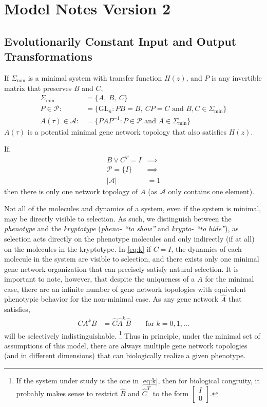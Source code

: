 \documentclass[11 pt]{article}
\newcommand{\A}{\mathcal{A}}
\newcommand{\1}{\mathbbm{1}}
\begin{document}
   \section{Model Notes Version 2}

   \subsection{Evolutionarily Constant Input and Output Transformations}
    If $\Sigma_{\min}$ is a minimal system with transfer function $H(z)$, and $P$ is any invertible matrix that preserves $B$ and $C$, 
    \begin{align*}
      \Sigma_{\min} &= \{A, \ B, \ C \} \\
      P \in \mathcal{P} :&= \{ \text{GL}_{n} : PB = B, \ CP = C \text{ and } B,C \in \Sigma_{\min} \} \\
      A(\tau) \in \A :&= \{P A P^{-1} : P \in \mathcal{P} \text{ and } A \in \Sigma_{\min} \}
    \end{align*}
    $A(\tau)$ is a potential minimal gene network topology that also satisfies $H(z)$. 

    If,
    \begin{align*} 
      B \lor C^{T} = I  &\implies \\
      \mathcal{P} = \{ I \} &\implies \\
      \left\vert \A \right\vert &= 1
    \end{align*}\label{eq:k}
   then there is only one network topology of $A$ (as $\A$ only contains one element).

   Not all of the molecules and dynamics of a system, even if the system is minimal, may be directly visible to selection. As such, we distinguish between the \emph{phenotype} and the \emph{kryptotype} (\emph{pheno- ``to show''} and \emph{krypto- ``to hide''}), as selection acts directly on the phenotype molecules and only indirectly (if at all) on the molecules in the kryptotype. In \ref{eq:k} if $C=I$, the dynamics of each molecule in the system are visible to selection, and there exists only one minimal gene network organization that can precisely satisfy natural selection. It is important to note, however, that despite the uniqueness of a $A$ for the minimal case, there are an infinite number of gene network topologies with equivalent phenotypic behavior for the non-minimal case. As any gene network $\widehat{A}$ that satisfies, 
   \begin{align*}
     CA^{k}B &= \widehat{C} \widehat{A}^{k} \widehat{B} \qquad \text{for } k = 0, 1, \dots
   \end{align*}
 will be selectively indistinguishable. \footnote{If the system under study is the one in \ref{eq:k}, then for biological congruity, it probably makes sense to restrict $\widehat{B}$ and $\widehat{C}^{T}$ to the form $\left[ \begin{array}{c} I \\ \hline 0 \end{array} \right]$.} Thus in principle, under the minimal set of assumptions of this model, there are always multiple gene network topologies (and in different dimensions) that can biologically realize a given phenotype.
\end{document}
